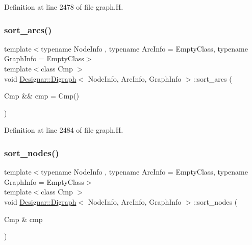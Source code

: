 Definition at line 2478 of file graph.\+H.

\mbox{\label{class_designar_1_1_digraph_a44895030e02896d6d35277eec136c49f}} 
\subsubsection{\texorpdfstring{sort\+\_\+arcs()}{sort\_arcs()}\hspace{0.1cm}{\footnotesize\ttfamily [2/2]}}
{\footnotesize\ttfamily template$<$typename Node\+Info , typename Arc\+Info  = Empty\+Class, typename Graph\+Info  = Empty\+Class$>$ \\
template$<$class Cmp $>$ \\
void \hyperlink{class_designar_1_1_digraph}{Designar\+::\+Digraph}$<$ Node\+Info, Arc\+Info, Graph\+Info $>$\+::sort\+\_\+arcs (\begin{DoxyParamCaption}\item[{Cmp \&\&}]{cmp = {\ttfamily Cmp()} }\end{DoxyParamCaption})\hspace{0.3cm}{\ttfamily [inline]}}



Definition at line 2484 of file graph.\+H.

\mbox{\label{class_designar_1_1_digraph_a5d057854409452b7d4fb2f9eec217b7d}} 
\subsubsection{\texorpdfstring{sort\+\_\+nodes()}{sort\_nodes()}\hspace{0.1cm}{\footnotesize\ttfamily [1/2]}}
{\footnotesize\ttfamily template$<$typename Node\+Info , typename Arc\+Info  = Empty\+Class, typename Graph\+Info  = Empty\+Class$>$ \\
template$<$class Cmp $>$ \\
void \hyperlink{class_designar_1_1_digraph}{Designar\+::\+Digraph}$<$ Node\+Info, Arc\+Info, Graph\+Info $>$\+::sort\+\_\+nodes (\begin{DoxyParamCaption}\item[{Cmp \&}]{cmp }\end{DoxyParamCaption})\hspace{0.3cm}{\ttfamily [inline]}}



